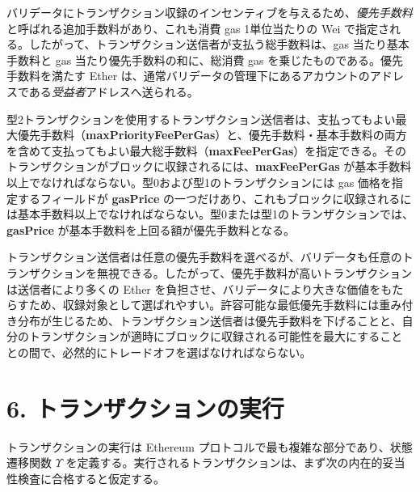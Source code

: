 \documentclass[
]{ltjsarticle}
\begin{document}
バリデータにトランザクション収録のインセンティブを与えるため、\emph{優先手数料}と呼ばれる追加手数料があり、これも消費
gas 1単位当たりの Wei
で指定される。したがって、トランザクション送信者が支払う総手数料は、gas
当たり基本手数料と gas 当たり優先手数料の和に、総消費 gas
を乗じたものである。優先手数料を満たす Ether
は、通常バリデータの管理下にあるアカウントのアドレスである\emph{受益者}アドレスへ送られる。

型2トランザクションを使用するトランザクション送信者は、支払ってもよい最大優先手数料（\textbf{maxPriorityFeePerGas}）と、優先手数料・基本手数料の両方を含めて支払ってもよい最大総手数料（\textbf{maxFeePerGas}）を指定できる。そのトランザクションがブロックに収録されるには、\textbf{maxFeePerGas}
が基本手数料以上でなければならない。型0および型1のトランザクションには
gas 価格を指定するフィールドが \textbf{gasPrice}
の一つだけあり、これもブロックに収録されるには基本手数料以上でなければならない。型0または型1のトランザクションでは、\textbf{gasPrice}
が基本手数料を上回る額が優先手数料となる。

トランザクション送信者は任意の優先手数料を選べるが、バリデータも任意のトランザクションを無視できる。したがって、優先手数料が高いトランザクションは送信者により多くの
Ether
を負担させ、バリデータにより大きな価値をもたらすため、収録対象として選ばれやすい。許容可能な最低優先手数料には重み付き分布が生じるため、トランザクション送信者は優先手数料を下げることと、自分のトランザクションが適時にブロックに収録される可能性を最大にすることとの間で、必然的にトレードオフを選ばなければならない。

\protect\hypertarget{ch:transactions}{}{}

\hypertarget{ux30c8ux30e9ux30f3ux30b6ux30afux30b7ux30e7ux30f3ux306eux5b9fux884c}{%
\section{6.
トランザクションの実行}\label{ux30c8ux30e9ux30f3ux30b6ux30afux30b7ux30e7ux30f3ux306eux5b9fux884c}}

トランザクションの実行は Ethereum
プロトコルで最も複雑な部分であり、状態遷移関数
\protect\hyperlink{Upsilon_state_transition}{\(\Upsilon\)}
を定義する。実行されるトランザクションは、まず次の内在的妥当性検査に合格すると仮定する。
\end{document}
